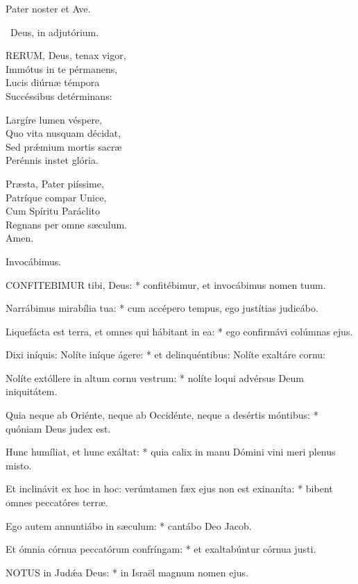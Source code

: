
Pater noster et Ave.

\V\ Deus, in adjutórium.


\lettrine[lines=2]{R}{ERUM}, Deus, tenax vigor,\\
Immótus in te pérmanens,\\
Lucis diúrnæ témpora\\
Succéssibus detérminans:

Largíre lumen véspere,\\
Quo vita nusquam décidat,\\
Sed prǽmium mortis sacræ\\
Perénnis instet glória.

Præsta, Pater piíssime,\\
Patríque compar Unice,\\
Cum Spíritu Paráclito\\
Regnans per omne sæculum.\\
Amen.

 Invocábimus.


\lettrine[lines=2]{C}{ONFITEBIMUR} tibi, Deus: * confitébimur, et invocábimus nomen tuum.

Narrábimus mirabília tua: * cum accépero tempus, ego justítias judicábo.

Liquefácta est terra, et omnes qui hábitant in ea: * ego confirmávi colúmnas ejus.

Dixi iníquis: Nolíte iníque ágere: * et delinquéntibus: Nolíte exaltáre cornu:

Nolíte extóllere in altum cornu vestrum: * nolíte loqui advérsus Deum iniquitátem.

Quia neque ab Oriénte, neque ab Occidénte, neque a desértis móntibus: * quóniam Deus judex est.

Hunc humíliat, et hunc exáltat: * quia calix in manu Dómini vini meri plenus misto.

Et inclinávit ex hoc in hoc: verúmtamen fæx ejus non est exinaníta: * bibent omnes peccatóres terræ.

Ego autem annuntiábo in sæculum: * cantábo Deo Jacob.

Et ómnia córnua peccatórum confríngam: * et exaltabúntur córnua justi.


\lettrine[lines=2]{N}{OTUS} in Judǽa Deus: * in Israël magnum nomen ejus.

